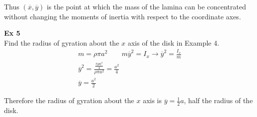 \documentclass{article}
\begin{document}
  Thus $ (\overline{x},\overline{y}) $ is the point at which the mass of the lamina can be concentrated without changing the moments of inertia with respect to the coordinate axes.
 
  \textbf{Ex 5}\\
  Find the radius of gyration about the $ x $ axis of the disk in Example 4.
  \[
    \begin{gathered}
      m=\rho \pi a^{2} \qquad m\overline{y}^{2}=I_x \to \overline{y}^{2}=\frac{I_x}{m}\\
      \overline{y}^{2}=\frac{\frac{\pi\rho a^{4}}{4}}{\rho \pi a^{2}} =\frac{a^{2}}{4}\\
      \boxed{\overline{y}=\frac{a^{2}}{2}}
    \end{gathered}
  \]

  Therefore the radius of gyration about the $ x $ axis is $ \overline{y}=\frac{1}{2}a $, half the radius of the disk.


  

  
\end{document}
